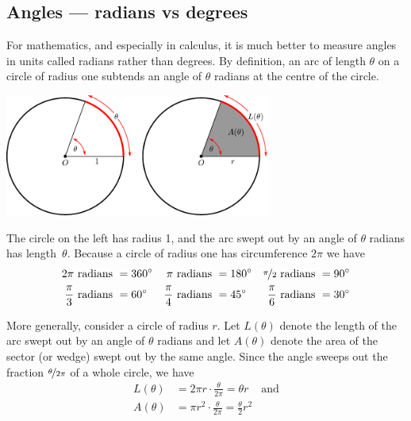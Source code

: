 \subsection{Angles --- radians vs degrees}\label{ssec rad deg}
For mathematics, and especially in calculus, it is much better to measure angles in units
called radians rather than degrees. By definition, an arc of length $\theta$ on a circle
of radius one subtends an angle of $\theta$ radians at the centre of the
circle.
\begin{center}
 \includegraphics[height=4cm]{radian}
\end{center}
The circle on the left has radius 1, and the arc swept out by an angle of
$\theta$ radians has length~$\theta$. Because a circle of radius one has circumference
$2\pi$ we have
\begin{align*}
   2\pi\text{ radians }&=360^\circ &
    \pi\text{ radians }&=180^\circ &
    \nicefrac{\pi}{2}\text{ radians }&=90^\circ \\
  \frac{\pi}{3}\text{ radians }&=60^\circ &
  \frac{\pi}{4}\text{ radians }&=45^\circ &
  \frac{\pi}{6}\text{ radians }&=30^\circ
\end{align*}

More generally, consider a circle of radius $r$. Let $L(\theta)$ denote the length of
the arc swept out by an angle of $\theta$ radians and let $A(\theta)$ denote the area of
the sector (or wedge) swept out by the same angle. Since the angle sweeps out the
fraction $\nicefrac{\theta}{2\pi}$ of a whole circle, we have
\begin{align*}
  L(\theta) &= 2\pi r \cdot \frac{\theta}{2\pi} = \theta r & \text{and}\\
  A(\theta) &= \pi r^2 \cdot \frac{\theta}{2\pi} = \frac{\theta}{2} r^2
\end{align*}

